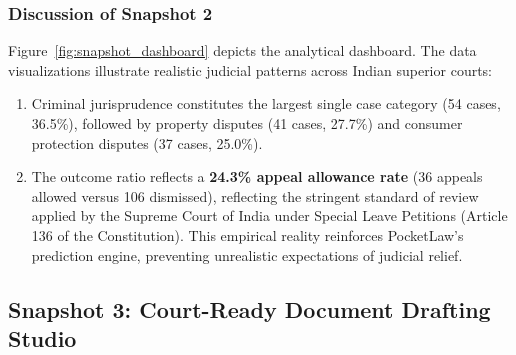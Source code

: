 \subsubsection{Discussion of Snapshot 2}
Figure~\ref{fig:snapshot_dashboard} depicts the analytical dashboard. The data visualizations illustrate realistic judicial patterns across Indian superior courts:
\begin{enumerate}
    \item Criminal jurisprudence constitutes the largest single case category (54 cases, 36.5\%), followed by property disputes (41 cases, 27.7\%) and consumer protection disputes (37 cases, 25.0\%).
    \item The outcome ratio reflects a \textbf{24.3\% appeal allowance rate} (36 appeals allowed versus 106 dismissed), reflecting the stringent standard of review applied by the Supreme Court of India under Special Leave Petitions (Article 136 of the Constitution). This empirical reality reinforces PocketLaw's prediction engine, preventing unrealistic expectations of judicial relief.
\end{enumerate}

\subsection{Snapshot 3: Court-Ready Document Drafting Studio}

